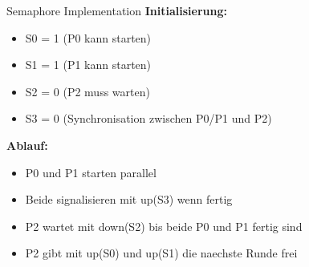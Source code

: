 \begin{example2}{Semaphore Implementation}
    \textbf{Initialisierung:}
    \begin{itemize}
        \item S0 = 1 (P0 kann starten)
        \item S1 = 1 (P1 kann starten) 
        \item S2 = 0 (P2 muss warten)
        \item S3 = 0 (Synchronisation zwischen P0/P1 und P2)
    \end{itemize}
    
    \textbf{Ablauf:}
    \begin{itemize}
        \item P0 und P1 starten parallel
        \item Beide signalisieren mit up(S3) wenn fertig
        \item P2 wartet mit down(S2) bis beide P0 und P1 fertig sind
        \item P2 gibt mit up(S0) und up(S1) die naechste Runde frei
    \end{itemize}
\end{example2}


